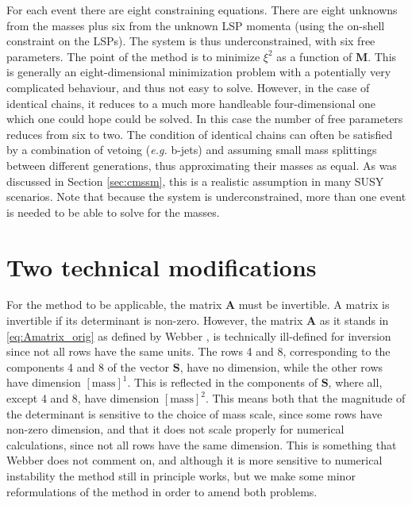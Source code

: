 \documentclass[twoside,english]{uiofysmaster}
\begin{document}
For each event there are eight constraining equations. There are eight unknowns from the masses plus six from the unknown LSP momenta (using the on-shell constraint on the LSPs). The system is thus underconstrained, with six free parameters. The point of the method is to minimize $\xi^2$ as a function of $\mathbf{M}$. This is generally an eight-dimensional minimization problem with a potentially very complicated behaviour, and thus not easy to solve. However, in the case of identical chains, it reduces to a much more handleable four-dimensional one which one could hope could be solved. In this case the number of free parameters reduces from six to two. The condition of identical chains can often be satisfied by a combination of vetoing ({\it e.g.} b-jets) and assuming small mass splittings between different generations, thus approximating their masses as equal. As was discussed in Section \ref{sec:cmssm}, this is a realistic assumption in many SUSY scenarios. Note that because the system is underconstrained, more than one event is needed to be able to solve for the masses.

\section{Two technical modifications}\label{sec:dimension_fixing}
For the method to be applicable, the matrix $\mathbf{A}$ must be invertible. A matrix is invertible if its determinant is non-zero. However, the matrix $\mathbf A$ as it stands in \eqref{eq:Amatrix_orig} as defined by Webber \cite{Webber:2009vm}, is technically ill-defined for inversion since not all rows have the same units. The rows 4 and 8, corresponding to the components 4 and 8 of the vector $\mathbf{S}$, have no dimension, while the other rows have dimension $[\mathrm{mass}]^1$. This is reflected in the components of $\mathbf{S}$, where all, except 4 and 8, have dimension $[\mathrm{mass}]^2$. This means both that the magnitude of the determinant is sensitive to the choice of mass scale, since some rows have non-zero dimension, and that it does not scale properly for numerical calculations, since not all rows have the same dimension. This is something that Webber does not comment on, and although it is more sensitive to numerical instability the method still in principle works, but we make some minor reformulations of the method in order to amend both problems.
\end{document}
